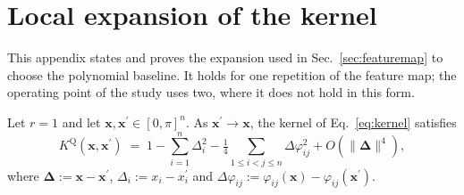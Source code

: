 \section{Local expansion of the kernel}\label{app:proofs}

This appendix states and proves the expansion used in Sec.~\ref{sec:featuremap} to choose the
polynomial baseline. It holds for one repetition of the feature map; the operating point of the
study uses two, where it does not hold in this form.

\begin{lemma}[Local expansion of the \ZZ{} kernel at $r=1$]
\label{lem:expansion}
Let $r=1$ and let $\bm{x},\bm{x}^{\prime}\in[0,\pi]^n$. As $\bm{x}^{\prime}\to\bm{x}$, the
kernel of Eq.~\eqref{eq:kernel} satisfies
\begin{equation}
\label{eq:expansion}
  K^{\mathrm{Q}}(\bm{x},\bm{x}^{\prime}) \;=\; 1
  - \sum_{i=1}^{n}\Delta_i^2
  - \tfrac{1}{4}\!\!\sum_{1\le i<j\le n}\!\!\Delta\varphi_{ij}^2
  + O(\|\bm{\Delta}\|^4),
\end{equation}
where $\bm{\Delta}:=\bm{x}-\bm{x}^{\prime}$, $\Delta_i := x_i - x_i^{\prime}$ and
$\Delta\varphi_{ij} := \varphi_{ij}(\bm{x}) - \varphi_{ij}(\bm{x}^{\prime})$.
\end{lemma}

